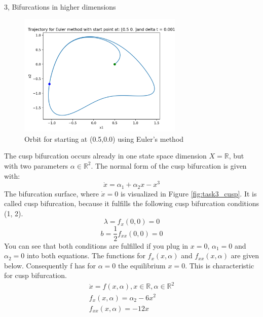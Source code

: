 \documentclass[10pt,a4paper]{article}
\begin{document}
\begin{task}{3, Bifurcations in higher dimensions}
\begin{figure}[H]
    \label{fig:task3_orbit2}
\end{figure}
\begin{figure}[H]
    \centering
    \includegraphics[width=0.7\textwidth]{../plots/Figure_4.png}
    \caption{Orbit for starting at (0.5,0.0) using Euler's method}
    \label{fig:task3_orbit0.5}
\end{figure}
\bigbreak
The cusp bifurcation occurs already in one state space dimension $X=\mathbb{R}$, but with two parameters $\alpha \in \mathbb{R}^2$. The normal form of the cusp bifurcation is given with:
\begin{equation*}
    \dot{x} = \alpha_1 + \alpha_2x - x^3
\end{equation*}
The bifurcation surface, where $\dot{x} = 0$ is visualized in Figure \ref{fig:task3_cusp}. It is called cusp bifurcation, because it fulfills the following cusp bifurcation conditions (1, 2). \\
\begin{equation}
     \lambda = f_x(0,0) = 0 
\end{equation}
\begin{equation}
     b = \frac{1}{2}f_{xx}(0,0) = 0
\end{equation}
You can see that both conditions are fulfilled if you plug in $x = 0$, $\alpha_1 = 0$ and $\alpha_2 = 0$ into both equations. The functions for $f_x(x,\alpha)$ and $f_{xx}(x,\alpha)$ are given below. Consequently f has for $\alpha=0$ the equilibrium $x= 0$. This is characteristic for cusp bifurcation. \cite{Kuznetsov:1998:EAB:289919}
\begin{align*}
    \dot{x} = f(x,\alpha), x\in \mathbb{R}, \alpha \in \mathbb{R}^2 \\
    f_x(x,\alpha) = \alpha_2 - 6x^2 \\
    f_{xx}(x,\alpha) = -12x 
\end{align*}
\begin{figure}[H]

\end{figure}
\end{task}
\end{document}
